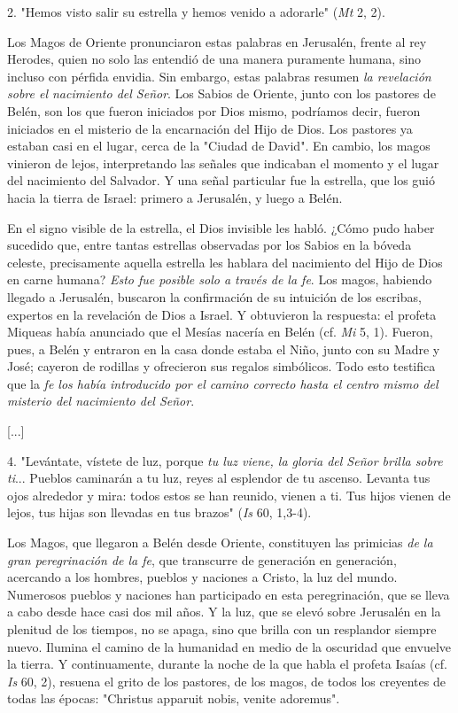 \begin{body}
2. "Hemos visto salir su estrella y hemos venido a adorarle" (\emph{Mt} 2, 2).

Los Magos de Oriente pronunciaron estas palabras en Jerusalén, frente al rey Herodes, quien no solo las entendió de una manera puramente humana, sino incluso con pérfida envidia. Sin embargo, estas palabras resumen \emph{la revelación sobre el nacimiento del Señor}. Los Sabios de Oriente, junto con los pastores de Belén, son los que fueron iniciados por Dios mismo, podríamos decir, fueron iniciados en el misterio de la encarnación del Hijo de Dios. Los pastores ya estaban casi en el lugar, cerca de la "Ciudad de David". En cambio, los magos vinieron de lejos, interpretando las señales que indicaban el momento y el lugar del nacimiento del Salvador. Y una señal particular fue la estrella, que los guió hacia la tierra de Israel: primero a Jerusalén, y luego a Belén.

En el signo visible de la estrella, el Dios invisible les habló. ¿Cómo pudo haber sucedido que, entre tantas estrellas observadas por los Sabios en la bóveda celeste, precisamente aquella estrella les hablara del nacimiento del Hijo de Dios en carne humana? \emph{Esto fue posible solo a través de la fe}. Los magos, habiendo llegado a Jerusalén, buscaron la confirmación de su intuición de los escribas, expertos en la revelación de Dios a Israel. Y obtuvieron la respuesta: el profeta Miqueas había anunciado que el Mesías nacería en Belén (cf. \emph{Mi} 5, 1). Fueron, pues, a Belén y entraron en la casa donde estaba el Niño, junto con su Madre y José; cayeron de rodillas y ofrecieron sus regalos simbólicos. Todo esto testifica que la \emph{fe los había introducido por el camino correcto hasta el centro mismo del misterio del nacimiento del Señor}.

{[}...{]}

4. "Levántate, vístete de luz, porque \emph{tu luz viene, la gloria del Señor brilla sobre ti}... Pueblos caminarán a tu luz, reyes al esplendor de tu ascenso. Levanta tus ojos alrededor y mira: todos estos se han reunido, vienen a ti. Tus hijos vienen de lejos, tus hijas son llevadas en tus brazos" (\emph{Is} 60, 1,3-4).

Los Magos, que llegaron a Belén desde Oriente, constituyen las primicias \emph{de la gran peregrinación de la fe}, que transcurre de generación en generación, acercando a los hombres, pueblos y naciones a Cristo, la luz del mundo. Numerosos pueblos y naciones han participado en esta peregrinación, que se lleva a cabo desde hace casi dos mil años. Y la luz, que se elevó sobre Jerusalén en la plenitud de los tiempos, no se apaga, sino que brilla con un resplandor siempre nuevo. Ilumina el camino de la humanidad en medio de la oscuridad que envuelve la tierra. Y continuamente, durante la noche de la que habla el profeta Isaías (cf. \emph{Is} 60, 2), resuena el grito de los pastores, de los magos, de todos los creyentes de todas las épocas: "Christus apparuit nobis, venite adoremus".


\end{body}
